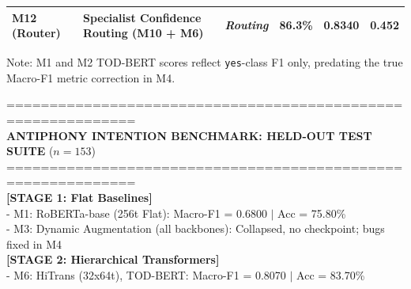 \begin{table}[p]
\begin{tabularx}{\textwidth}{l>{\raggedright\arraybackslash}Xlccc}
    \midrule
    \rowcolor{lightbg}
    M12 (Router) & Specialist Confidence Routing (M10 + M6) & \textit{Routing} & 86.3\% & 0.8340 & \textbf{0.452} \\
    \bottomrule
  \end{tabularx}
  \vspace{2pt}
  \footnotesize{\newline *Note: M1 and M2 TOD-BERT scores reflect \texttt{yes}-class F1 only, predating the true Macro-F1 metric correction in M4.}
\end{table}

\begin{terminalbox}
============================================================= \\ \relax
\textbf{ANTIPHONY INTENTION BENCHMARK: HELD-OUT TEST SUITE} ($n=153$) \\ \relax
============================================================= \\ \relax
\textbf{[STAGE 1: Flat Baselines]} \\ \relax
- M1: RoBERTa-base (256t Flat)\hphantom{XXXXXXXXXXXXXXXXX}: Macro-F1 = 0.6800 $\mid$ Acc = 75.80\% \\ \relax
- M3: Dynamic Augmentation (all backbones)\hphantom{XXXXX}: Collapsed, no checkpoint; bugs fixed in M4 \\ \relax
\textbf{[STAGE 2: Hierarchical Transformers]} \\ \relax
- M6: HiTrans (32x64t), TOD-BERT\hphantom{XXXXXXXXXXXXXXX}: Macro-F1 = 0.8070 $\mid$ Acc = 83.70\% \\ \relax

\end{terminalbox}
